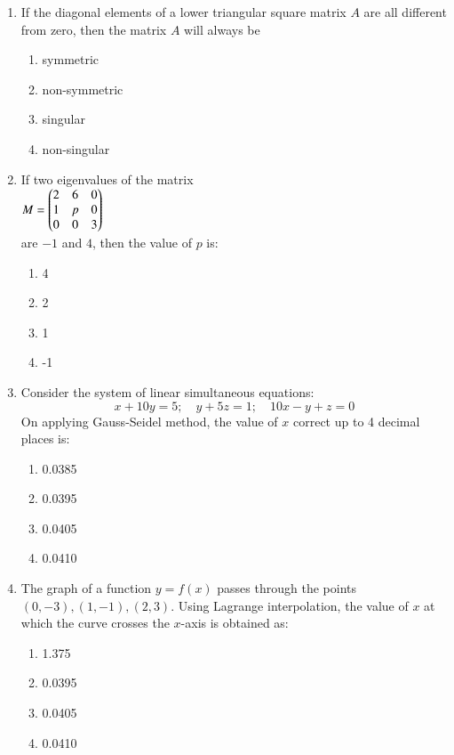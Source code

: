 \documentclass[journal,12pt,onecolumn]{IEEEtran}
\theoremstyle{remark}
\begin{document}
\begin{enumerate}
    \item If the diagonal elements of a lower triangular square matrix $A$ are all different from zero, then the matrix $A$ will always be
    \begin{multicols}{4}
    \begin{enumerate}
        \item symmetric
        \item non-symmetric
        \item singular
        \item non-singular
    \end{enumerate}
\end{multicols}
    \item If two eigenvalues of the matrix\\ $M = \begin{pmatrix} 2 & 6 & 0 \\ 1 & p & 0 \\ 0 & 0 & 3\end{pmatrix}$\\ are $-1$ and $4$, then the value of $p$ is:
    \begin{multicols}{4}
    \begin{enumerate}
        \item 4
        \item 2
        \item 1
        \item -1
    \end{enumerate}
\end{multicols}
    \item Consider the system of linear simultaneous equations:
    \[
    x + 10y = 5;\quad y + 5z = 1; \quad 10x - y + z = 0
    \]
    On applying Gauss-Seidel method, the value of $x$ correct up to 4 decimal places is:
    \begin{multicols}{4}
    \begin{enumerate}
        \item 0.0385
        \item 0.0395
        \item 0.0405
        \item 0.0410
    \end{enumerate}
\end{multicols}
    \item The graph of a function $y = f(x)$ passes through the points $(0, -3), (1, -1), (2, 3)$. Using Lagrange interpolation, the value of $x$ at which the curve crosses the $x$-axis is obtained as:
    \begin{multicols}{4}
    \begin{enumerate}
    \item 1.375
    \item 0.0395
    \item 0.0405
    \item 0.0410
    \end{enumerate}
 \end{multicols}
 

\end{enumerate}
\end{document}
